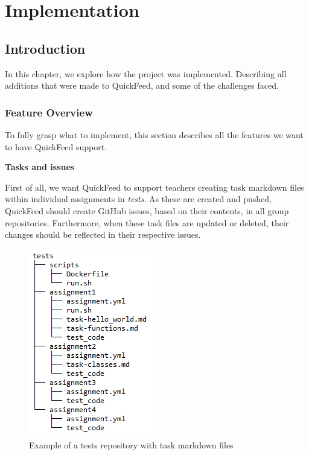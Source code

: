 
\chapter{Implementation}
\label{ch:implementation}

\section{Introduction}

In this chapter, we explore how the project was implemented.
Describing all additions that were made to QuickFeed, and some of the challenges faced.

\subsection{Feature Overview}

To fully grasp what to implement, this section describes all the features we want to have QuickFeed support.

\textbf{Tasks and issues}

First of all, we want QuickFeed to support teachers creating task markdown files within individual assignments in \textit{tests}.
As these are created and pushed, QuickFeed should create GitHub issues, based on their contents, in all group repositories.
Furthermore, when these task files are updated or deleted, their changes should be reflected in their respective issues.

\begin{figure}[ht]
    \centering
    \includegraphics[scale=0.8]{photos/tests-repository-structure-tasks.PNG}
    \caption{Example of a tests repository with task markdown files}
    \label{fig:tests-repository-structure-tasks}
\end{figure}

